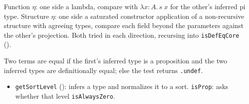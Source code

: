 \begin{definition}
\label{def:kernel-eta-rules}
\leanok
{}

 Function $\eta$: one side a lambda, compare with $\lambda x{:}A.\,s\;x$ for the
other's inferred pi type. Structure $\eta$: one side a saturated constructor application of a
non-recursive structure with agreeing types, compare each field beyond the parameters against the
other's projection. Both tried in each direction, recursing into \texttt{isDefEqCore}
().
\end{definition}

\begin{definition}
\label{def:kernel-proof-irrel}
\leanok
{}

 Two terms are equal if the first's inferred type is a proposition and the two
inferred types are definitionally equal; else the test returns \texttt{.undef}.
\begin{itemize}
\item \texttt{getSortLevel} (): infers a type and
normalizes it to a sort. \texttt{isProp}: asks whether that level \texttt{isAlwaysZero}.
\end{itemize}
\end{definition}

